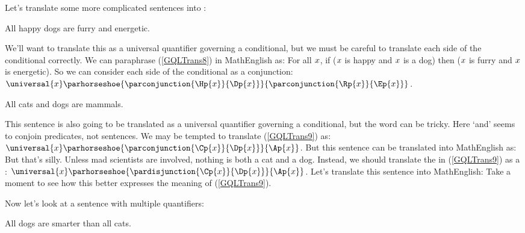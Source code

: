 Let's translate some more complicated sentences into \GQL{}:

\begin{menumerate}
	\item\label{GQLTrans8} All happy dogs are furry and energetic.
\end{menumerate}

\noindent{}We'll want to translate this as a universal quantifier governing a conditional, but we must be careful to translate each side of the conditional correctly.  We can paraphrase (\ref{GQLTrans8}) in MathEnglish as: For all $x$, if ($x$ is happy and $x$ is a dog) then ($x$ is furry and $x$ is energetic).  So we can consider each side of the conditional as a conjunction: $\universal{\variable{x}}\parhorseshoe{\parconjunction{\Hp{\variable{x}}}{\Dp{\variable{x}}}}{\parconjunction{\Rp{\variable{x}}}{\Ep{\variable{x}}}}$.

\begin{menumerate}
	\item\label{GQLTrans9} All cats and dogs are mammals.
\end{menumerate}

\noindent{}This sentence is also going to be translated as a universal quantifier governing a conditional, but the word  can be tricky.  Here `and' seems to conjoin predicates, not sentences.  We may be tempted to translate (\ref{GQLTrans9}) as: $\universal{\variable{x}}\parhorseshoe{\parconjunction{\Cp{\variable{x}}}{\Dp{\variable{x}}}}{\Ap{\variable{x}}}$.  But this \GQL{} sentence can be translated into MathEnglish as:   But that's silly.  Unless mad scientists are involved, nothing is both a cat and a dog.  Instead, we should translate the  in (\ref{GQLTrans9}) as a \mention{$\VEE$}:  $\universal{\variable{x}}\parhorseshoe{\pardisjunction{\Cp{\variable{x}}}{\Dp{\variable{x}}}}{\Ap{\variable{x}}}$.  Let's translate this \GQL{} sentence into MathEnglish:   Take a moment to see how this better expresses the meaning of (\ref{GQLTrans9}).

Now let's look at a sentence with multiple quantifiers:

\begin{menumerate}
	\item\label{GQLTrans10} All dogs are smarter than all cats.
\end{menumerate}

